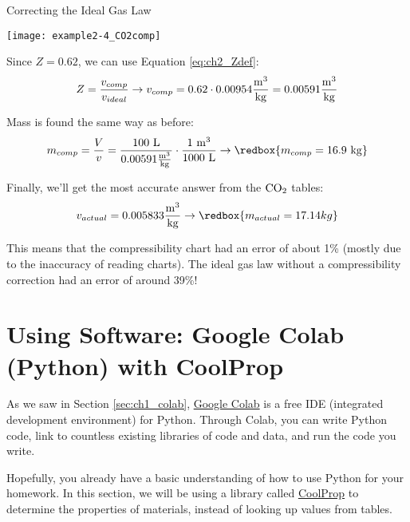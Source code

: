 \begin{example}[label={ex:ch2idealGas}]{Correcting the Ideal Gas Law}
\begin{center}
\texttt{[image: example2-4\_CO2comp]}
\end{center}

Since $Z=0.62$, we can use Equation \ref{eq:ch2_Zdef}:
\begin{equation*}
  Z = \frac{v_{comp}}{v_{ideal}} \rightarrow v_{comp} = 0.62 \cdot 0.00954 \frac{\rm m^3}{\rm kg} = 0.00591 \frac{\rm m^3}{\rm kg}
\end{equation*}

Mass is found the same way as before:
\begin{equation*}
    m_{comp} = \frac{V}{v} = \frac{100\ \rm L}{0.00591 \frac{\rm m^3}{\rm kg}} \cdot \frac{1\ \rm m^3}{1000\ \rm L} \rightarrow \redbox{m_{comp} = 16.9\ {\rm kg}}
\end{equation*}

Finally, we'll get the most accurate answer from the $\rm CO_2$ tables:
\begin{equation*}
  v_{actual} = 0.005833 \frac{\rm m^3}{\rm kg} \rightarrow \redbox{m_{actual} = 17.14 kg}
\end{equation*}

This means that the compressibility chart had an error of about 1\% (mostly due to the inaccuracy of reading charts). The ideal gas law without a compressibility correction had an error of around 39\%!

\end{example}


\section{Using Software: Google Colab (Python) with CoolProp} \label{sec:ch2_colab}
As we saw in Section \ref{sec:ch1_colab}, \href{https://colab.research.google.com}{Google Colab} is a free IDE (integrated development environment) for Python.  Through Colab, you can write Python code, link to countless existing libraries of code and data, and run the code you write.

Hopefully, you already have a basic understanding of how to use Python for your homework.  In this section, we will be using a library called \href{http://www.coolprop.org/}{CoolProp} to determine the properties of materials, instead of looking up values from tables.


